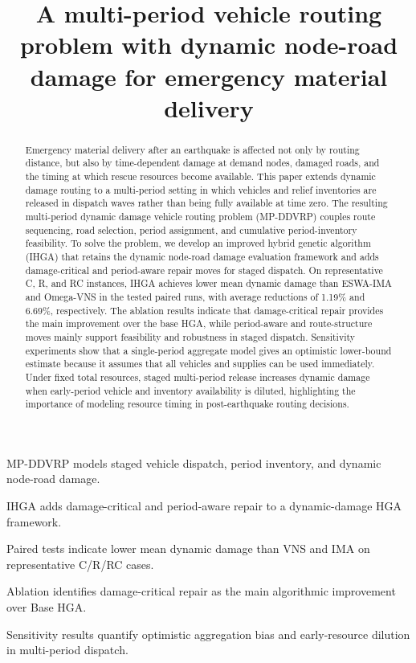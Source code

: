 ﻿\documentclass[preprint,12pt,authoryear]{elsarticle}
\begin{document}
\begin{frontmatter}

\title{A multi-period vehicle routing problem with dynamic node-road damage for emergency material delivery}

\author{} 

\begin{abstract}
Emergency material delivery after an earthquake is affected not only by routing distance, but also by time-dependent damage at demand nodes, damaged roads, and the timing at which rescue resources become available. This paper extends dynamic damage routing to a multi-period setting in which vehicles and relief inventories are released in dispatch waves rather than being fully available at time zero. The resulting multi-period dynamic damage vehicle routing problem (MP-DDVRP) couples route sequencing, road selection, period assignment, and cumulative period-inventory feasibility. To solve the problem, we develop an improved hybrid genetic algorithm (IHGA) that retains the dynamic node-road damage evaluation framework and adds damage-critical and period-aware repair moves for staged dispatch. On representative C, R, and RC instances, IHGA achieves lower mean dynamic damage than ESWA-IMA and Omega-VNS in the tested paired runs, with average reductions of 1.19\% and 6.69\%, respectively. The ablation results indicate that damage-critical repair provides the main improvement over the base HGA, while period-aware and route-structure moves mainly support feasibility and robustness in staged dispatch. Sensitivity experiments show that a single-period aggregate model gives an optimistic lower-bound estimate because it assumes that all vehicles and supplies can be used immediately. Under fixed total resources, staged multi-period release increases dynamic damage when early-period vehicle and inventory availability is diluted, highlighting the importance of modeling resource timing in post-earthquake routing decisions.
\end{abstract}

\begin{highlights}
\item MP-DDVRP models staged vehicle dispatch, period inventory, and dynamic node-road damage.
\item IHGA adds damage-critical and period-aware repair to a dynamic-damage HGA framework.
\item Paired tests indicate lower mean dynamic damage than VNS and IMA on representative C/R/RC cases.
\item Ablation identifies damage-critical repair as the main algorithmic improvement over Base HGA.
\item Sensitivity results quantify optimistic aggregation bias and early-resource dilution in multi-period dispatch.
\end{highlights}


\end{frontmatter}
\end{document}

